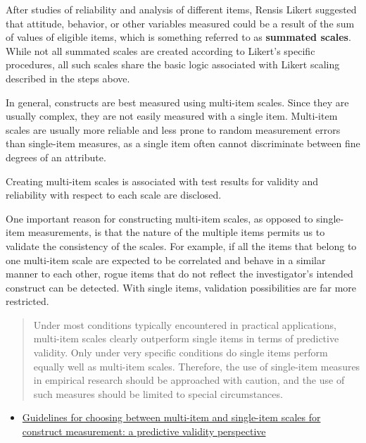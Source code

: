 \documentclass[]{book}
\providecommand{\tightlist}{%
  \setlength{\itemsep}{0pt}\setlength{\parskip}{0pt}}
\theoremstyle{definition}
\theoremstyle{definition}
\theoremstyle{definition}
\theoremstyle{remark}
\begin{document}
After studies of reliability and analysis of different items, Rensis
Likert suggested that attitude, behavior, or other variables measured
could be a result of the sum of values of eligible items, which is
something referred to as \textbf{summated scales}. While not all
summated scales are created according to Likert's specific procedures,
all such scales share the basic logic associated with Likert scaling
described in the steps above.

In general, constructs are best measured using multi-item scales. Since
they are usually complex, they are not easily measured with a single
item. Multi-item scales are usually more reliable and less prone to
random measurement errors than single-item measures, as a single item
often cannot discriminate between fine degrees of an attribute.

Creating multi-item scales is associated with test results for validity
and reliability with respect to each scale are disclosed.

One important reason for constructing multi-item scales, as opposed to
single-item measurements, is that the nature of the multiple items
permits us to validate the consistency of the scales. For example, if
all the items that belong to one multi-item scale are expected to be
correlated and behave in a similar manner to each other, rogue items
that do not reflect the investigator's intended construct can be
detected. With single items, validation possibilities are far more
restricted.

\begin{quote}
Under most conditions typically encountered in practical applications,
multi-item scales clearly outperform single items in terms of predictive
validity. Only under very specific conditions do single items perform
equally well as multi-item scales. Therefore, the use of single-item
measures in empirical research should be approached with caution, and
the use of such measures should be limited to special circumstances.
\end{quote}

\begin{itemize}
\tightlist
\item
  \href{https://link.springer.com/article/10.1007/s11747-011-0300-3}{Guidelines
  for choosing between multi-item and single-item scales for construct
  measurement: a predictive validity perspective}
\end{itemize}
\end{document}

